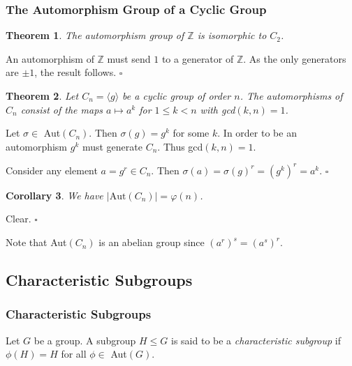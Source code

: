 \documentclass[10pt]{article}
\newtheorem{theorem}{Theorem}[section]
\newtheorem{corollary}[theorem]{Corollary}
\newenvironment{proof}[1][Proof]{\begin{trivlist}
\item[\hskip \labelsep {\itshape #1}]}{\end{trivlist}}
\newenvironment{definition}[1][Definition]{\begin{trivlist}
\item[\hskip \labelsep {\bfseries #1}]}{\end{trivlist}}
\begin{document}
\subsubsection{The Automorphism Group of a Cyclic Group}

\begin{theorem}
The automorphism group of $\mathbb{Z}$ is isomorphic to $C_2$.
\end{theorem}

\begin{proof}
An automorphism of $\mathbb{Z}$ must send $1$ to a generator of $\mathbb{Z}$. As the only generators are $\pm 1$, the result follows. $\square$
\end{proof}

\begin{theorem}
Let $C_n = \langle g \rangle$ be a cyclic group of order $n$. The automorphisms of $C_n$ consist of the maps $a \mapsto a^k$ for $1 \leq k < n$ with gcd$(k, n) = 1$.
\end{theorem}

\begin{proof}
Let $\sigma \in$ Aut$(C_n)$. Then $\sigma(g) = g^k$ for some $k$. In order to be an automorphism $g^k$ must generate $C_n$. Thus gcd$(k, n) = 1$.

Consider any element $a = g^r \in C_n$. Then $\sigma(a) = \sigma(g)^r = (g^k)^r = a^k$. $\square$
\end{proof}

\begin{corollary}
We have $|\mbox{Aut}(C_n)| = \varphi(n)$.
\end{corollary}

\begin{proof}
Clear. $\square$
\end{proof}

Note that Aut$(C_n)$ is an abelian group since $(a^r)^s = (a^s)^r$.

\subsection{Characteristic Subgroups}

\subsubsection{Characteristic Subgroups}

\begin{definition}
Let $G$ be a group. A subgroup $H \leq G$ is said to be a \emph{characteristic subgroup} if $\phi(H) = H$ for all $\phi \in$ Aut$(G)$.
\end{definition}
\end{document}
